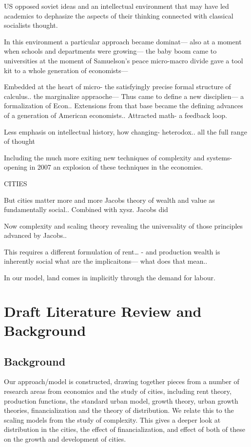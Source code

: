 US opposed soviet ideas and an intellectual environment that may have led academics to dephasize the aspects of their thinking connected with classical socialists thought. 

In this environment a particular approach became dominat— also at a moment when schools and departments were growing— the baby boom came to universities at the moment of Samuelson’s peace micro-macro divide gave a tool kit to a whole generation of economists— 

Embedded at the heart of micro- the satisfyingly precise formal structure of calculus.. the marginalize appraoche— 
Thus came to define a new disciplien— a formalization of Econ.. 
Extensions from that base became the defining advances of a generation of American economists..
Attracted math- a feedback loop.

Less emphasis on intellectual history, how changing- heterodox.. all the full range of thought

Including the much more exiting new techniques of complexity and systems- opening in 2007 an explosion of these techniques in the economies. 




CITIES

But cities matter more and more
Jacobs theory of wealth and value as fundamentally social.. 
Combined with xysz. Jacobs did

Now complexity and scaling theory revealing the universality of those principles advanced by Jacobs..

This requires a different formulation of rent… - and production wealth is inherently social what are the implicaitons— what does that mean.. 






In our model, land comes in implicitly through the demand for labour. 


\chapter{Draft Literature Review and Background}

\section{Background}
\label{Sec:Background}
\newpage
Our approach/model is constructed, drawing together pieces from a number of research areas from economics and the study of cities, including rent theory, production functions, the standard urban model, growth theory, urban growth theories, financialization and the theory of distribution. 
We relate this to the scaling models from the study of complexity. This gives a deeper look at distribution in the cities, the effect of financialization, and effect of both of these on the growth and development of cities. 

